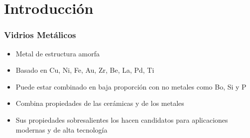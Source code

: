 
\section[Introducci\'on]{Introducci\'on}

\begin{frame}
\frametitle{Vidrios Metálicos}

\begin{itemize}
 \item Metal de estructura amorfa
 \item Basado en Cu, Ni, Fe, Au, Zr, Be, La, Pd, Ti
 \item Puede estar combinado en baja proporción con no metales como Bo, Si y P
 \item Combina propiedades de las cerámicas y de los metales
 \item Sus propiedades sobresalientes los hacen candidatos para aplicaciones modernas y de alta tecnología
\end{itemize}
\end{frame}


\newcommand{\defaultBlocks}{
  \setbeamercolor{block title}{fg=white, bg=hsrmWarmGreyDark}
  \setbeamercolor{block body}{parent=palette secondary}
  \setbeamercolor{block title example}{fg=white, bg=hsrmSec1Dark}
  \setbeamercolor{block body example}{fg=white, bg=hsrmSec1}
  \setbeamercolor{block title alerted}{fg=white, bg=hsrmRedDark}
  \setbeamercolor{block body alerted}{fg=white, bg=hsrmRed}
}

\newcommand{\ventaja}[2]{
  \setbeamercolor{block title}{bg=goodTitle,fg=white}%
  \setbeamercolor{block body}{bg=goodDesc,fg=black}%
  \only<#1>{
    \begin{block}{Ventaja}%
    #2
    \end{block}%
   }
  \defaultBlocks%
}

\newcommand{\desventaja}[2]{
  \setbeamercolor{block title}{bg=alertTitle,fg=white}%
  \setbeamercolor{block body}{bg=alertDesc,fg=black}%
  \only<#1>{
    \begin{block}<#1>{Desventaja}%
    #2
    \end{block}%
   }
  \defaultBlocks%
}

